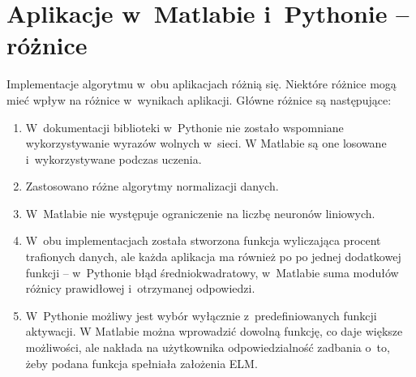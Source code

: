 \documentclass[pl]{minipw} %
\begin{document}
\section{Aplikacje w~Matlabie i~Pythonie -- różnice}
\label{porownanie_aplikacji}
Implementacje algorytmu w~obu aplikacjach różnią się. 
Niektóre różnice mogą mieć wpływ na różnice w~wynikach aplikacji.
Główne różnice są następujące:
\begin{enumerate}
\item W~dokumentacji biblioteki w~Pythonie nie zostało wspomniane wykorzystywanie wyrazów wolnych w~sieci.
W Matlabie są one losowane i~wykorzystywane podczas uczenia.
\item Zastosowano różne algorytmy normalizacji danych.
\item W~Matlabie nie występuje ograniczenie na liczbę neuronów liniowych.
\item W~obu implementacjach została stworzona funkcja wyliczająca procent trafionych danych, ale każda aplikacja ma również po po jednej dodatkowej funkcji -- w~Pythonie błąd średniokwadratowy, w~Matlabie suma modułów różnicy prawidłowej i~otrzymanej odpowiedzi.
\item W~Pythonie możliwy jest wybór wyłącznie z~predefiniowanych funkcji aktywacji. 
W Matlabie można wprowadzić dowolną funkcję, co daje większe możliwości, ale nakłada na użytkownika odpowiedzialność zadbania o~to, żeby podana funkcja spełniała założenia ELM.
\end{enumerate}
\end{document}
